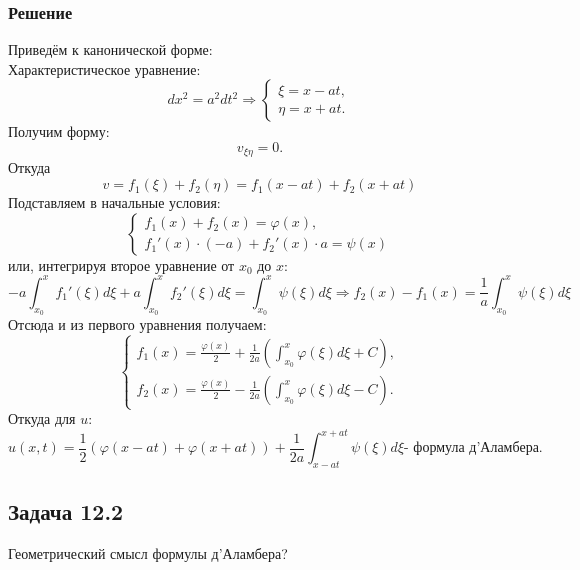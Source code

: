 \documentclass[11pt]{article}
\begin{document}
\subsubsection{Решение}
\label{sec:org8acaf2c}
Приведём к канонической форме:\\
Характеристическое уравнение:
\begin{equation}
dx^2 = a^2dt^2 \Rightarrow
\begin{cases}
\xi = x - at, \\
\eta = x + at.
\end{cases}
\end{equation}
Получим форму:
\begin{equation}
v_{\xi\eta} = 0.
\end{equation}
Откуда
\begin{equation}
v = f_1(\xi) + f_2(\eta) = f_1(x - at) + f_2(x + at)
\end{equation}
Подставляем в начальные условия:
\begin{equation}
\begin{cases}
f_1(x) + f_2(x) = \varphi(x), \\
f_1'(x)\cdot(-a) + f_2'(x)\cdot a = \psi(x)
\end{cases}
\end{equation}
или, интегрируя второе уравнение от $x_0$ до $x$:
\begin{equation}
-a\int_{x_0}^xf_1'(\xi)d\xi + a\int_{x_0}^xf_2'(\xi)d\xi = \int_{x_0}^x\psi(\xi)d\xi
\Rightarrow
f_2(x) - f_1(x) = \frac1a\int_{x_0}^x\psi(\xi)d\xi
\end{equation}
Отсюда и из первого уравнения получаем:
\begin{equation}
\begin{cases}
f_1(x) = \frac{\varphi(x)}2 + \frac1{2a}\left(\int_{x_0}^x\varphi(\xi)d\xi + C\right), \\
f_2(x) = \frac{\varphi(x)}2 - \frac1{2a}\left(\int_{x_0}^x\varphi(\xi)d\xi - C\right).
\end{cases}
\end{equation}
Откуда для $u$:
\begin{equation}
u(x, t) = \frac12(\varphi(x - at) + \varphi(x + at)) + \frac1{2a}\int_{x - at}^{x + at}\psi(\xi)d\xi \text{- формула д'Аламбера.}
\end{equation}
\subsection{Задача 12.2}
\label{sec:orgac0a4f3}
Геометрический смысл формулы д'Аламбера?
\end{document}
